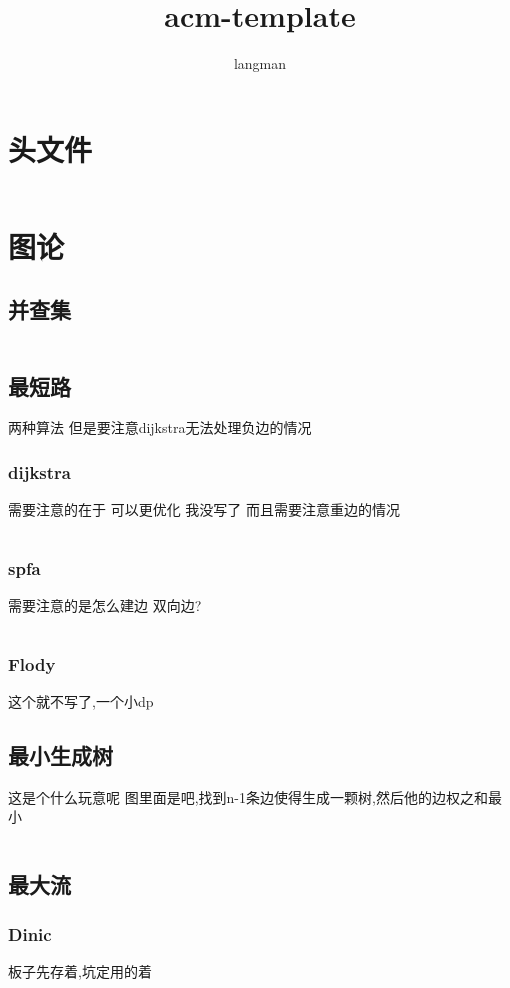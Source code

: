 \documentclass[a4paper,11pt]{article}
\author{langman}
\title{acm-template}
\begin{document}
\maketitle
\begin{CJK}{UTF8}{gbsn}
\tableofcontents
\newpage
\section{头文件}
\inputminted{c++}{../scoure/head.cpp}
\newpage
\section{图论}
\subsection{并查集}
\inputminted{c++}{../scoure/Graph_theory/bingchick.cpp}
\newpage
\subsection{最短路}
两种算法 但是要注意dijkstra无法处理负边的情况
\subsubsection{dijkstra}
需要注意的在于 可以更优化 我没写了 而且需要注意重边的情况
\inputminted{c++}{../scoure/Graph_theory/dijkstra.cpp}
\subsubsection{spfa}
需要注意的是怎么建边 双向边?
\inputminted{c++}{../scoure/Graph_theory/spfa.cpp}
\subsubsection{Flody}
这个就不写了,一个小dp
\subsection{最小生成树}
这是个什么玩意呢 图里面是吧,找到n-1条边使得生成一颗树,然后他的边权之和最小
\inputminted{c++}{../scoure/Graph_theory/prime.cpp}
\subsection{最大流}
\subsubsection{Dinic}
板子先存着,坑定用的着
\inputminted{c++}{../scoure/Graph_theory/dinic.cpp}
\newpage

\end{CJK}
\end{document}
